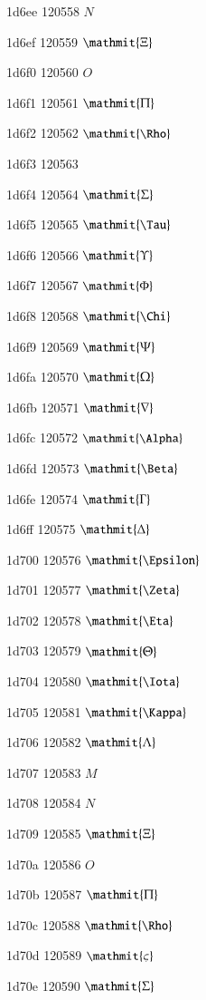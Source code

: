 \documentclass[11pt]{article}
\begin{document}
1d6ee 120558 \ensuremath{N}

1d6ef 120559 \ensuremath{\mathmit{\Xi}}

1d6f0 120560 \ensuremath{O}

1d6f1 120561 \ensuremath{\mathmit{\Pi}}

1d6f2 120562 \ensuremath{\mathmit{\Rho}}

1d6f3 120563 \mathmit{\vartheta}

1d6f4 120564 \ensuremath{\mathmit{\Sigma}}

1d6f5 120565 \ensuremath{\mathmit{\Tau}}

1d6f6 120566 \ensuremath{\mathmit{\Upsilon}}

1d6f7 120567 \ensuremath{\mathmit{\Phi}}

1d6f8 120568 \ensuremath{\mathmit{\Chi}}

1d6f9 120569 \ensuremath{\mathmit{\Psi}}

1d6fa 120570 \ensuremath{\mathmit{\Omega}}

1d6fb 120571 \ensuremath{\mathmit{\nabla}}

1d6fc 120572 \ensuremath{\mathmit{\Alpha}}

1d6fd 120573 \ensuremath{\mathmit{\Beta}}

1d6fe 120574 \ensuremath{\mathmit{\Gamma}}

1d6ff 120575 \ensuremath{\mathmit{\Delta}}

1d700 120576 \ensuremath{\mathmit{\Epsilon}}

1d701 120577 \ensuremath{\mathmit{\Zeta}}

1d702 120578 \ensuremath{\mathmit{\Eta}}

1d703 120579 \ensuremath{\mathmit{\Theta}}

1d704 120580 \ensuremath{\mathmit{\Iota}}

1d705 120581 \ensuremath{\mathmit{\Kappa}}

1d706 120582 \ensuremath{\mathmit{\Lambda}}

1d707 120583 \ensuremath{M}

1d708 120584 \ensuremath{N}

1d709 120585 \ensuremath{\mathmit{\Xi}}

1d70a 120586 \ensuremath{O}

1d70b 120587 \ensuremath{\mathmit{\Pi}}

1d70c 120588 \ensuremath{\mathmit{\Rho}}

1d70d 120589 \ensuremath{\mathmit{\varsigma}}

1d70e 120590 \ensuremath{\mathmit{\Sigma}}
\end{document}
